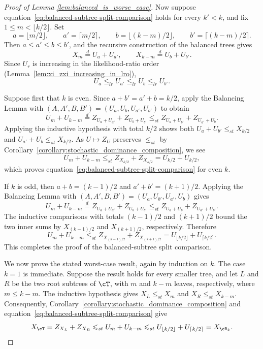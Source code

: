 \begin{proof}[Proof of Lemma \ref{lem:balanced_is_worse_case}]
Now suppose equation~\eqref{eq:balanced-subtree-split-comparison}
holds for every $k'<k$, and fix $1\leq m < \lfloor k/2\rfloor$. Set
\[
a=\lfloor m/2\rfloor,\qquad a'=\lceil m/2\rceil,\qquad
b=\lfloor(k-m)/2\rfloor,\qquad b'=\lceil(k-m)/2\rceil.
\]
Then $a\leq a'\leq b\leq b'$, and the recursive construction of the balanced
trees gives
\[
X_m\stackrel{d}{=}U_a+U_{a'},
\qquad
X_{k-m}\stackrel{d}{=}U_b+U_{b'}.
\]
Since $U_r$ is increasing in the likelihood-ratio order (Lemma~\ref{lem:xi_zxi_increasing_in_lro}),
\[
U_a\leq_{lr}U_{a'}\leq_{lr}U_b\leq_{lr}U_{b'}.
\]

Suppose first that $k$ is even. Since
$a+b'=a'+b=k/2$, apply the Balancing Lemma with
$(A,A',B,B')=(U_a,U_b,U_{a'},U_{b'})$ to obtain
%
\begin{equation*}
U_m+U_{k-m} \stackrel{d}{=}Z_{U_a+U_{a'}}+Z_{U_b+U_{b'}} \leq_{st}Z_{U_a+U_{b'}}+Z_{U_{a'}+U_b}.
\end{equation*}
%
Applying the inductive hypothesis with total $k/2$ shows both $U_a + U_{b'} \leq_{st} X_{k/2}$ and $U_{a'} + U_b \leq_{st} X_{k/2}$.
As $U \mapsto Z_U$ preserves $\leq_{st}$ by Corollary~\ref{corollary:stochastic_dominance_composition}, we see
\[
U_m+U_{k-m}
\leq_{st}Z_{X_{k/2}}+Z_{X_{k/2}}
=U_{k/2}+U_{k/2},
\]
which proves equation~\eqref{eq:balanced-subtree-split-comparison} for even $k$.

If $k$ is odd, then
$a+b=(k-1)/2$ and $a'+b'=(k+1)/2$. Applying the Balancing Lemma with
$(A,A',B,B')=(U_a,U_{b'},U_{a'},U_b)$ gives
%
\begin{equation*}
    U_m+U_{k-m}\stackrel{d}{=}Z_{U_a+U_{a'}}+Z_{U_b+U_{b'}}\leq_{st}Z_{U_a+U_b}+Z_{U_{a'}+U_{b'}}.
\end{equation*}
%
The inductive comparisons with totals $(k-1)/2$ and $(k+1)/2$ bound
the two inner sums by $X_{(k-1)/2}$ and $X_{(k+1)/2}$, respectively. Therefore
\[
U_m+U_{k-m}
\leq_{st}Z_{X_{(k-1)/2}}+Z_{X_{(k+1)/2}}
=U_{\lfloor k/2\rfloor}+U_{\lceil k/2\rceil}.
\]
This completes the proof of the balanced-subtree split comparison.

We now prove the stated worst-case result, again by induction on $k$. The case $k=1$
is immediate. Suppose the result holds for every smaller tree, and let $L$ and
$R$ be the two root subtrees of $\cT$, with $m$ and $k-m$ leaves, respectively,
where $m\leq k-m$. The inductive hypothesis gives
$X_L\leq_{st}X_m$ and $X_R\leq_{st}X_{k-m}$. Consequently,
Corollary~\ref{corollary:stochastic_dominance_composition} and
equation~\eqref{eq:balanced-subtree-split-comparison} give
\[
X_\cT
=Z_{X_L}+Z_{X_R}
\leq_{st}U_m+U_{k-m}
\leq_{st}U_{\lfloor k/2\rfloor}+U_{\lceil k/2\rceil}
=X_{\cB_k}.
\]
\end{proof}

